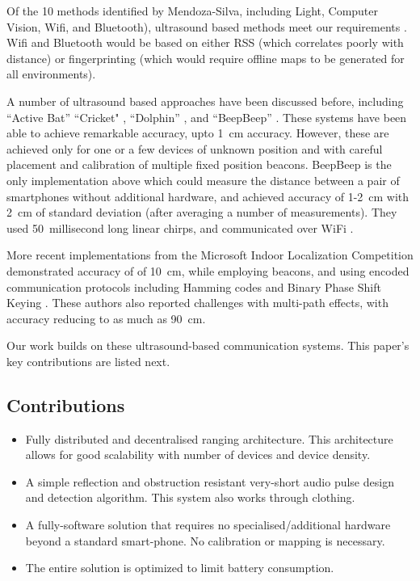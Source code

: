 \documentclass{article}
\begin{document}
Of the 10 methods identified by Mendoza-Silva, including Light, Computer Vision, Wifi, and Bluetooth), ultrasound based methods meet our requirements \cite{MendozaSilva2019}. Wifi and Bluetooth would be based on either RSS (which correlates poorly with distance) or fingerprinting (which would require offline maps to be generated for all environments).

A number of ultrasound based approaches have been discussed before, including ``Active Bat'' \cite{Ward1997} ``Cricket" \cite{Cricket}, ``Dolphin'' \cite{Fukuju}, and ``BeepBeep'' \cite{Peng2007}. These systems have been able to achieve remarkable accuracy, upto 1~cm accuracy. However, these are achieved  only for one or a few devices of unknown position and with careful placement and calibration of multiple fixed position beacons. BeepBeep is the only implementation above which could measure the distance between a pair of smartphones without additional hardware, and achieved accuracy of 1-2~cm with 2~cm of standard deviation (after averaging a number of measurements). They used 50~millisecond long linear chirps, and communicated over WiFi \cite{Peng2007}. 

More recent implementations from the Microsoft Indoor Localization Competition demonstrated accuracy of of 10~cm, while employing beacons, and using encoded communication protocols including Hamming codes and Binary Phase Shift Keying \cite{Urena2018}. These authors also reported challenges with multi-path effects, with accuracy reducing to as much as 90~cm.

Our work builds on these ultrasound-based communication systems. This paper's key contributions are listed next.

\subsection{Contributions}
\label{sec:contributions}

\begin{itemize}
    \item Fully distributed and decentralised ranging architecture. This architecture allows for good scalability with number of devices and device density.
    \item A simple reflection and obstruction resistant very-short audio pulse design and detection algorithm. This system also works through clothing. 
    \item A fully-software solution that requires no specialised/additional hardware beyond a standard smart-phone. No calibration or mapping is necessary.
    \item The entire solution is optimized to limit battery consumption.
\end{itemize}
\end{document}
